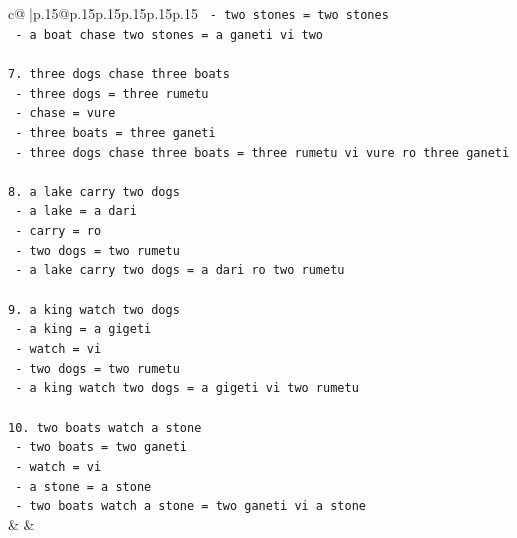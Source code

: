 \documentclass{article}
\begin{document}
{\begin{supertabular}{c@{$\;$}|p{.15\linewidth}@{}p{.15\linewidth}p{.15\linewidth}p{.15\linewidth}p{.15\linewidth}p{.15\linewidth}}
{{{\texttt{   {-} two stones = two stones} \\
\texttt{   {-} a boat chase two stones = a ganeti vi two} \\
\\ 
\texttt{7. three dogs chase three boats} \\
\texttt{   {-} three dogs = three rumetu} \\
\texttt{   {-} chase = vure} \\
\texttt{   {-} three boats = three ganeti} \\
\texttt{   {-} three dogs chase three boats = three rumetu vi vure ro three ganeti} \\
\\ 
\texttt{8. a lake carry two dogs} \\
\texttt{   {-} a lake = a dari} \\
\texttt{   {-} carry = ro} \\
\texttt{   {-} two dogs = two rumetu} \\
\texttt{   {-} a lake carry two dogs = a dari ro two rumetu} \\
\\ 
\texttt{9. a king watch two dogs} \\
\texttt{   {-} a king = a gigeti} \\
\texttt{   {-} watch = vi} \\
\texttt{   {-} two dogs = two rumetu} \\
\texttt{   {-} a king watch two dogs = a gigeti vi two rumetu} \\
\\ 
\texttt{10. two boats watch a stone} \\
\texttt{    {-} two boats = two ganeti} \\
\texttt{    {-} watch = vi} \\
\texttt{    {-} a stone = a stone} \\
\texttt{    {-} two boats watch a stone = two ganeti vi a stone} \\
            }
        }
    }
    & & \\ \\


\end{supertabular}}
\end{document}

